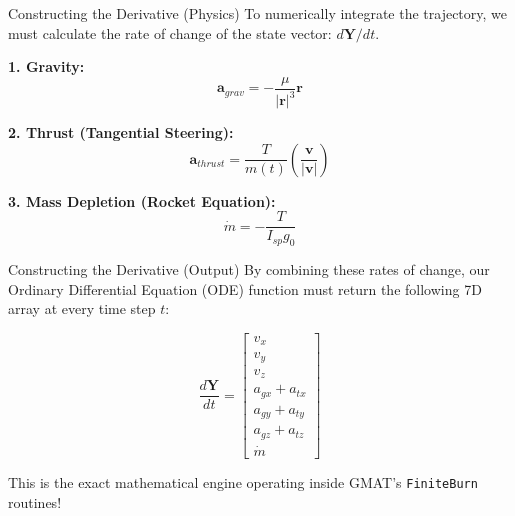 \documentclass[11pt]{beamer}
\begin{document}
\begin{frame}{Constructing the Derivative (Physics)}
    To numerically integrate the trajectory, we must calculate the rate of change of the state vector: $d\boldsymbol{Y}/dt$.
    
    \vspace{0.3cm}
    \textbf{1. Gravity:}
    \begin{equation}
        \boldsymbol{a}_{grav} = -\frac{\mu}{|\boldsymbol{r}|^3} \boldsymbol{r}
    \end{equation}
    
    \textbf{2. Thrust (Tangential Steering):}
    \begin{equation}
        \boldsymbol{a}_{thrust} = \frac{T}{m(t)} \left( \frac{\boldsymbol{v}}{|\boldsymbol{v}|} \right)
    \end{equation}
    
    \textbf{3. Mass Depletion (Rocket Equation):}
    \begin{equation}
        \dot{m} = -\frac{T}{I_{sp} g_0}
    \end{equation}
\end{frame}

\begin{frame}{Constructing the Derivative (Output)}
    By combining these rates of change, our Ordinary Differential Equation (ODE) function must return the following 7D array at every time step $t$:
    
    \vspace{0.3cm}
    \begin{equation}
        \frac{d\boldsymbol{Y}}{dt} = 
        \begin{bmatrix}
            v_x \\ 
            v_y \\ 
            v_z \\ 
            a_{gx} + a_{tx} \\ 
            a_{gy} + a_{ty} \\ 
            a_{gz} + a_{tz} \\ 
            \dot{m}
        \end{bmatrix}
    \end{equation}
    
    \vspace{0.3cm}
    This is the exact mathematical engine operating inside GMAT's \texttt{FiniteBurn} routines!
\end{frame}

\end{document}
